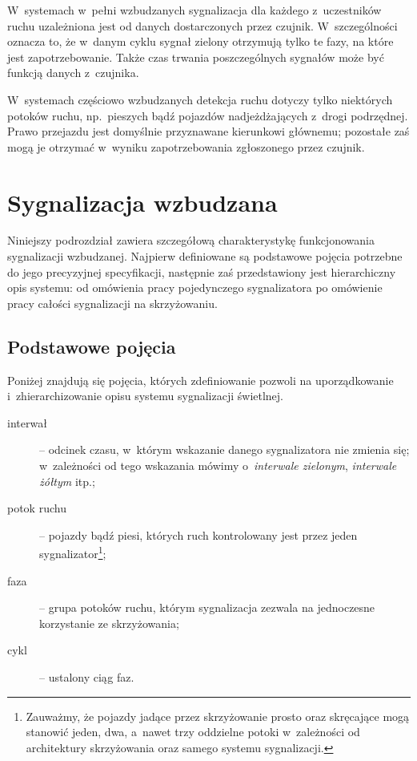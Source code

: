 \documentclass{pracamgr}
\theoremstyle{plain}
\begin{document}
W~systemach w~pełni wzbudzanych sygnalizacja dla każdego z~uczestników
ruchu uzależniona jest od danych dostarczonych przez czujnik.
W~szczególności oznacza to, że w~danym cyklu sygnał zielony otrzymują
tylko te fazy, na które jest zapotrzebowanie. Także czas trwania
poszczególnych sygnałów może być funkcją danych z~czujnika.

W~systemach częściowo wzbudzanych detekcja ruchu dotyczy tylko
niektórych potoków ruchu, np.~pieszych bądź pojazdów nadjeżdżających
z~drogi podrzędnej. Prawo przejazdu jest domyślnie przyznawane
kierunkowi głównemu; pozostałe zaś mogą je otrzymać w~wyniku
zapotrzebowania zgłoszonego przez czujnik.

\section{Sygnalizacja wzbudzana}
\label{s:sygn-szczegoly}

Niniejszy podrozdział zawiera szczegółową charakterystykę
funkcjonowania sygnalizacji wzbudzanej. Najpierw definiowane są
podstawowe pojęcia potrzebne do jego precyzyjnej specyfikacji,
następnie zaś przedstawiony jest hierarchiczny opis systemu: od
omówienia pracy pojedynczego sygnalizatora po omówienie pracy całości
sygnalizacji na skrzyżowaniu.

\subsection{Podstawowe pojęcia}
\label{ss:pojecia}

Poniżej znajdują się pojęcia, których zdefiniowanie pozwoli na
uporządkowanie i~zhierarchizowanie opisu systemu sygnalizacji
świetlnej.
\begin{description}
  \item[interwał] -- odcinek czasu, w~którym wskazanie danego
  sygnalizatora nie zmienia się; w~zależności od tego wskazania mówimy
  o~\emph{interwale zielonym}, \emph{interwale żółtym} itp.;
  \item[potok ruchu] -- pojazdy bądź piesi, których ruch kontrolowany
  jest przez jeden sygnalizator\footnote{Zauważmy, że pojazdy jadące
    przez skrzyżowanie prosto oraz skręcające mogą stanowić jeden,
    dwa, a~nawet trzy oddzielne potoki w~zależności od architektury
    skrzyżowania oraz samego systemu sygnalizacji.};
  \item[faza] -- grupa potoków ruchu, którym sygnalizacja zezwala na
  jednoczesne korzystanie ze skrzyżowania;
  \item[cykl] -- ustalony ciąg faz.
\end{description}
\end{document}
